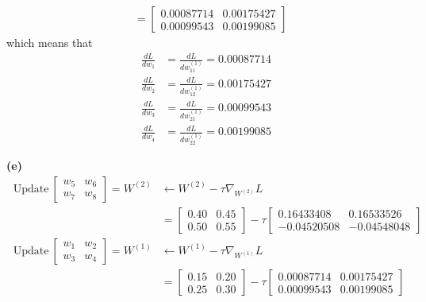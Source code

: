 \documentclass[a4paper, 12pt]{article}
\begin{document}
\begin{solution}
\begin{align*}
    &= \begin{bmatrix}
        0.00087714 & 0.00175427 \\
        0.00099543 & 0.00199085
    \end{bmatrix}
    \end{align*}
    which means that \begin{align*}
        \frac{dL}{dw_1} &= \frac{dL}{dw^{(1)}_{11}} = 0.00087714 \\
        \frac{dL}{dw_2} &= \frac{dL}{dw^{(1)}_{12}} = 0.00175427\\
        \frac{dL}{dw_3} &= \frac{dL}{dw^{(1)}_{21}} = 0.00099543 \\
        \frac{dL}{dw_4} &= \frac{dL}{dw^{(1)}_{22}} = 0.00199085
    \end{align*}

    \textbf{(e)}
    \begin{align*}
    \:\text{Update}\: \begin{bmatrix}
    w_5 & w_6 \\
    w_7 & w_8
    \end{bmatrix} = W^{(2)} &\leftarrow W^{(2)} - \tau \nabla_{W^{(2)}}L \\
    &= \begin{bmatrix}
        0.40 & 0.45 \\
        0.50 & 0.55
        \end{bmatrix} - \tau \begin{bmatrix}
            0.16433408 &  0.16533526 \\
        -0.04520508  & -0.04548048
        \end{bmatrix} \\
    \:\text{Update}\: \begin{bmatrix}
        w_1 & w_2 \\
        w_3 & w_4
        \end{bmatrix} = W^{(1)} &\leftarrow W^{(1)} - \tau \nabla_{W^{(1)}}L \\
        &= \begin{bmatrix}
            0.15 & 0.20 \\
            0.25 & 0.30
            \end{bmatrix} - \tau \begin{bmatrix}
                0.00087714 & 0.00175427 \\
                0.00099543 & 0.00199085
            \end{bmatrix}
    \end{align*}
\end{solution}
\end{document}
